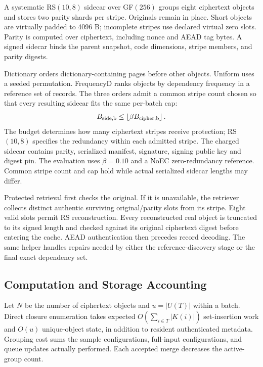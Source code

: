 \documentclass[10pt,journal]{IEEEtran}
\begin{document}
A systematic RS$(10,8)$ sidecar over GF$(256)$ groups eight ciphertext
objects and stores two parity shards per stripe. Originals remain in place.
Short objects are virtually padded to 4096 B; incomplete stripes use declared
virtual zero slots. Parity is computed over ciphertext, including nonce and
AEAD tag bytes. A signed sidecar binds the parent snapshot, code dimensions,
stripe members, and parity digests.

Dictionary orders dictionary-containing pages before other objects. Uniform
uses a seeded permutation. FrequencyD ranks objects by dependency frequency
in a reference set of records. The three orders admit a common stripe count
chosen so that every resulting sidecar fits the same per-batch cap:
\begin{equation}\label{eq:budget}
B_{\rm side,b}\leq\left\lfloor\beta B_{\rm cipher,b}\right\rfloor.
\end{equation}
The budget determines how many ciphertext stripes receive protection;
RS$(10,8)$ specifies the redundancy within each admitted stripe.
The charged sidecar contains parity, serialized manifest, signature, signing
public key and digest pin. The evaluation uses $\beta=0.10$ and a NoEC
zero-redundancy reference. Common stripe count and cap hold while actual
serialized sidecar lengths may differ.

Protected retrieval first checks the original. If it is unavailable, the
retriever collects distinct authentic surviving original/parity slots from
its stripe. Eight valid slots permit RS reconstruction. Every reconstructed
real object is truncated to its signed length and checked against its
original ciphertext digest before entering the cache. AEAD authentication
then precedes record decoding. The same helper handles repairs needed by
either the reference-discovery stage or the final exact dependency set.

\subsection{Computation and Storage Accounting}\label{sec:accounting}
Let $N$ be the number of ciphertext objects and $u=|U(T)|$ within a batch.
Direct closure enumeration takes expected
$O(\sum_{i\in T}|K(i)|)$ set-insertion work and $O(u)$ unique-object state,
in addition to resident authenticated metadata. Grouping cost sums the
sample configurations, full-input configurations, and queue updates actually
performed. Each accepted merge decreases the active-group count.
\end{document}
